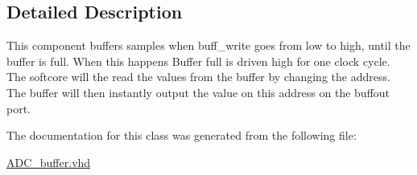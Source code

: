 \subsection{Detailed Description}
This component buffers samples when buff\-\_\-write goes from low to high, until the buffer is full. When this happens Buffer full is driven high for one clock cycle. The softcore will the read the values from the buffer by changing the address. The buffer will then instantly output the value on this address on the buffout port. 

The documentation for this class was generated from the following file\-:\begin{DoxyCompactItemize}
\item 
\hyperlink{ADC__buffer_8vhd}{A\-D\-C\-\_\-buffer.\-vhd}\end{DoxyCompactItemize}
